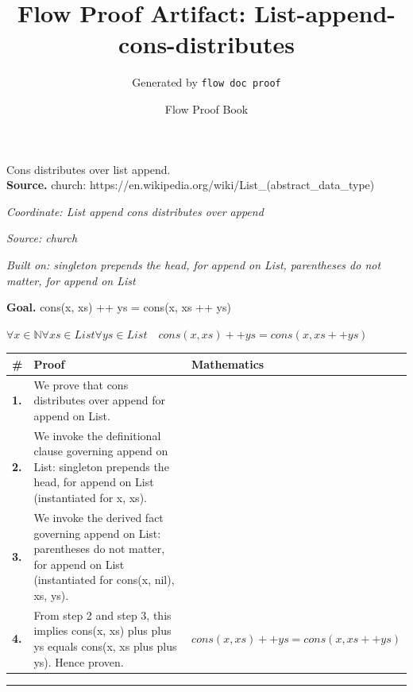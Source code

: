 \documentclass[11pt]{article}
\title{Flow Proof Artifact: List-append-cons-distributes}
\author{Generated by \texttt{flow doc proof}}
\date{Flow Proof Book}
\theoremstyle{definition}
\begin{document}
\maketitle
Cons distributes over list append.\\[0.5em]
\textbf{Source.} church: https://en.wikipedia.org/wiki/List\_(abstract\_data\_type)\\[0.5em]
\bigskip
{}\par
\smallskip\noindent\textit{Coordinate: List \cdot append \cdot cons distributes over append}\par
\smallskip\noindent\textit{Source: church}\par
\smallskip\noindent\textit{Built on: singleton prepends the head, for append on List, parentheses do not matter, for append on List}\par
\medskip
\noindent\textbf{Goal.} cons(x, xs) ++ ys = cons(x, xs ++ ys)\par
\noindent$\displaystyle \forall x \in \mathbb{N} \forall xs \in List \forall ys \in List\quad cons(x, xs) ++ ys = cons(x, xs ++ ys)$\par
\medskip
\noindent
\begin{tabular}{@{} >{\raggedright\arraybackslash}p{} >{\raggedright\arraybackslash}p{} >{\raggedleft\arraybackslash}p{} @{}}
\textbf{\#} & \textbf{Proof} & \textbf{Mathematics} \\
\midrule
\textbf{1.} & We prove that cons distributes over append for append on List. & \\[0.45em]
\textbf{2.} & We invoke the definitional clause governing append on List: singleton prepends the head, for append on List (instantiated for x, xs). & \\[0.45em]
\textbf{3.} & We invoke the derived fact governing append on List: parentheses do not matter, for append on List (instantiated for cons(x, nil), xs, ys). & \\[0.45em]
\textbf{4.} & From step 2 and step 3, this implies cons(x, xs) plus plus ys equals cons(x, xs plus plus ys). Hence proven. & $\displaystyle cons(x, xs) ++ ys = cons(x, xs ++ ys)$ \\[0.45em]
\bottomrule
\end{tabular}
\label{thm:List-append-cons_distributes_over_append}
\par\medskip\hrule
\end{document}
